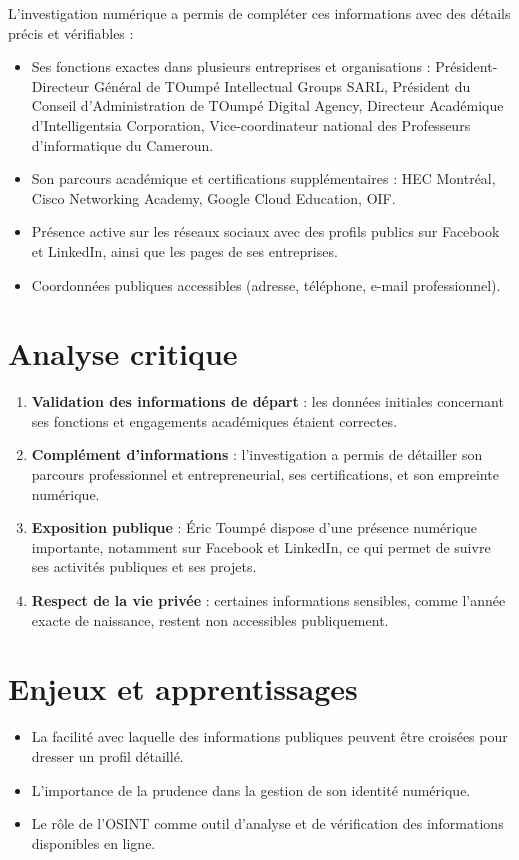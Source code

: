 \documentclass[memoire, 12pt]{report}
\begin{document}
L’investigation numérique a permis de compléter ces informations avec des détails précis et vérifiables :
\begin{itemize}
    \item Ses fonctions exactes dans plusieurs entreprises et organisations : Président-Directeur Général de TOumpé Intellectual Groups SARL, Président du Conseil d’Administration de TOumpé Digital Agency, Directeur Académique d’Intelligentsia Corporation, Vice-coordinateur national des Professeurs d’informatique du Cameroun.
    \item Son parcours académique et certifications supplémentaires : HEC Montréal, Cisco Networking Academy, Google Cloud Education, OIF.
    \item Présence active sur les réseaux sociaux avec des profils publics sur Facebook et LinkedIn, ainsi que les pages de ses entreprises.
    \item Coordonnées publiques accessibles (adresse, téléphone, e-mail professionnel).
\end{itemize}


\section{Analyse critique}
\begin{enumerate}
    \item \textbf{Validation des informations de départ} : les données initiales concernant ses fonctions et engagements académiques étaient correctes.
    \item \textbf{Complément d’informations} : l’investigation a permis de détailler son parcours professionnel et entrepreneurial, ses certifications, et son empreinte numérique.
    \item \textbf{Exposition publique} : Éric Toumpé dispose d’une présence numérique importante, notamment sur Facebook et LinkedIn, ce qui permet de suivre ses activités publiques et ses projets.
    \item \textbf{Respect de la vie privée} : certaines informations sensibles, comme l’année exacte de naissance, restent non accessibles publiquement.
\end{enumerate}

\section{Enjeux et apprentissages}
\begin{itemize}
    \item La facilité avec laquelle des informations publiques peuvent être croisées pour dresser un profil détaillé.
    \item L’importance de la prudence dans la gestion de son identité numérique.
    \item Le rôle de l’OSINT comme outil d’analyse et de vérification des informations disponibles en ligne.
\end{itemize}
\end{document}
